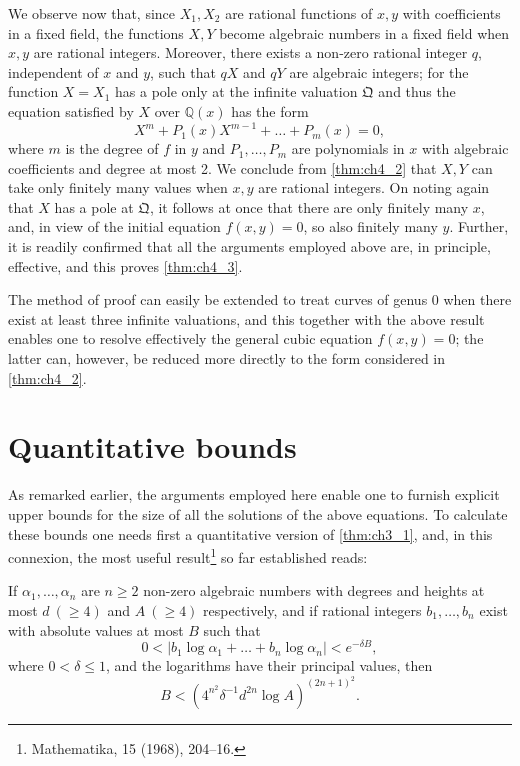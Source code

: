We observe now that, since $X_1, X_2$ are rational functions of $x, y$ with coefficients in a fixed field, the functions $X, Y$ become algebraic numbers in a fixed field when $x, y$ are rational integers. Moreover, there exists a non-zero rational integer $q$, independent of $x$ and $y$, such that $qX$ and $qY$ are algebraic integers; for the function $X = X_1$ has a pole only at the infinite valuation $\mathfrak{Q}$ and thus the equation satisfied by $X$ over $\mathbb{Q}(x)$ has the form
\[
X^m + P_1(x) X^{m-1} + \dots + P_m(x) = 0,
\]
where $m$ is the degree of $f$ in $y$ and $P_1, \dots, P_m$ are polynomials in $x$ with algebraic coefficients and degree at most 2. We conclude from \autoref{thm:ch4_2} that $X, Y$ can take only finitely many values when $x, y$ are rational integers. On noting again that $X$ has a pole at $\mathfrak{Q}$, it follows at once that there are only finitely many $x$, and, in view of the initial equation $f(x, y) = 0$, so also finitely many $y$. Further, it is readily confirmed that all the arguments employed above are, in principle, effective, and this proves \autoref{thm:ch4_3}.

The method of proof can easily be extended to treat curves of genus 0 when there exist at least three infinite valuations, and this together with the above result enables one to resolve effectively the general cubic equation $f(x, y) = 0$; the latter can, however, be reduced more directly to the form considered in \autoref{thm:ch4_2}.

\section{Quantitative bounds}\label{sec:ch4_5}

As remarked earlier, the arguments employed here enable one to furnish explicit upper bounds for the size of all the solutions of the above equations. To calculate these bounds one needs first a quantitative version of \autoref{thm:ch3_1}, and, in this connexion, the most useful result\footnote{Mathematika, 15 (1968), 204--16.} so far established reads:

If $\alpha_1, \dots, \alpha_n$ are $n \ge 2$ non-zero algebraic numbers with degrees and heights at most $d \ (\ge 4)$ and $A \ (\ge 4)$ respectively, and if rational integers $b_1, \dots, b_n$ exist with absolute values at most $B$ such that
\[
0 < |b_1 \log \alpha_1 + \dots + b_n \log \alpha_n| < e^{-\delta B},
\]
where $0 < \delta \le 1$, and the logarithms have their principal values, then
\[
B < (4^{n^2} \delta^{-1} d^{2n} \log A)^{(2n+1)^2}.
\]

